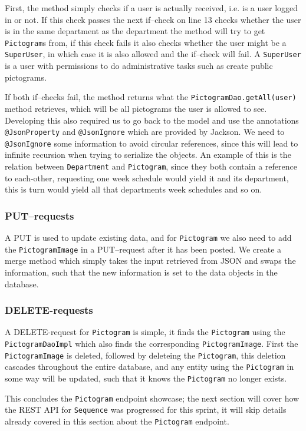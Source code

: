 First, the method simply checks if a user is actually received, i.e. is a user logged in or not.
If this check passes the next if--check on line 13 checks whether the user is in the same department as the department the method will try to get \texttt{Pictogram}s from, if this check fails it also checks whether the user might be a \texttt{SuperUser}, in which case it is also allowed and the if--check will fail.
A \texttt{SuperUser} is a user with permissions to do administrative tasks such as create public pictograms.

If both if--checks fail, the method returns what the \texttt{PictogramDao.getAll(user)} method retrieves, which will be all pictograms the user is allowed to see.
Developing this also required us to go back to the model and use the annotations \texttt{@JsonProperty} and \texttt{@JsonIgnore} which are provided by Jackson.
We need to \texttt{@JsonIgnore} some information to avoid circular references, since this will lead to infinite recursion when trying to serialize the objects.
An example of this is the relation between \texttt{Department} and \texttt{Pictogram}, since they both contain a reference to each-other, requesting one week schedule would yield it and its department, this is turn would yield all that departments week schedules and so on.

\subsubsection*{PUT--requests}
A PUT is used to update existing data, and for \texttt{Pictogram} we also need to add the \texttt{PictogramImage} in a PUT--request after it has been posted.
We create a merge method which simply takes the input retrieved from JSON and swaps the information, such that the new information is set to the data objects in the database.

\subsubsection*{DELETE-requests}
A DELETE-request for \texttt{Pictogram} is simple, it finds the \texttt{Pictogram} using the \texttt{PictogramDaoImpl} which also finds the corresponding \texttt{PictogramImage}.
First the \texttt{PictogramImage} is deleted, followed by deleteing the \texttt{Pictogram}, this deletion cascades throughout the entire database, and any entity using the \texttt{Pictogram} in some way will be updated, such that it knows the \texttt{Pictogram} no longer exists.


This concludes the \texttt{Pictogram} endpoint showcase; the next section will cover how the REST API for \texttt{Sequence} was progressed for this sprint, it will skip details already covered in this section about the \texttt{Pictogram} endpoint.
